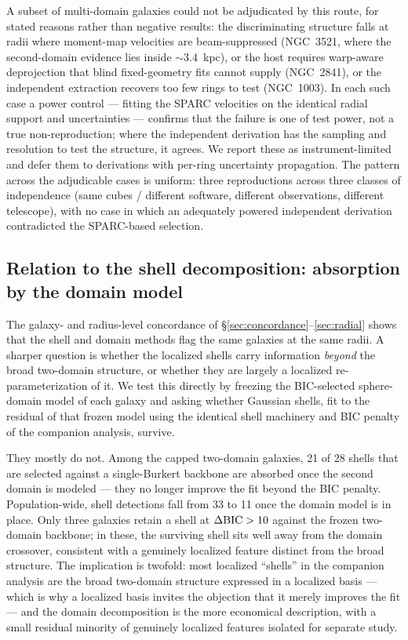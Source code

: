 \documentclass[twocolumn]{aastex631}
\newcommand{\dbic}{\Delta{\rm BIC}}
\begin{document}
A subset of multi-domain galaxies could not be adjudicated by this route, for
stated reasons rather than negative results: the discriminating structure falls
at radii where moment-map velocities are beam-suppressed (NGC~3521, where the
second-domain evidence lies inside $\sim 3.4$~kpc), or the host requires
warp-aware deprojection that blind fixed-geometry fits cannot supply (NGC~2841),
or the independent extraction recovers too few rings to test (NGC~1003). In each
such case a power control --- fitting the SPARC velocities on the identical
radial support and uncertainties --- confirms that the failure is one of test
power, not a true non-reproduction; where the independent derivation has the
sampling and resolution to test the structure, it agrees. We report these as
instrument-limited and defer them to derivations with per-ring uncertainty
propagation. The pattern across the adjudicable cases is uniform: three
reproductions across three classes of independence (same cubes / different
software, different observations, different telescope), with no case in which an
adequately powered independent derivation contradicted the SPARC-based selection.

\subsection{Relation to the shell decomposition: absorption by the domain model} \label{sec:absorption}

The galaxy- and radius-level concordance of \S\ref{sec:concordance}--\ref{sec:radial}
shows that the shell and domain methods flag the same galaxies at the same radii.
A sharper question is whether the localized shells carry information \emph{beyond}
the broad two-domain structure, or whether they are largely a localized
re-parameterization of it. We test this directly by freezing the BIC-selected
sphere-domain model of each galaxy and asking whether Gaussian shells, fit to the
residual of that frozen model using the identical shell machinery and BIC penalty
of the companion analysis, survive.

They mostly do not. Among the capped two-domain galaxies, 21 of 28 shells that
are selected against a single-Burkert backbone are absorbed once the second
domain is modeled --- they no longer improve the fit beyond the BIC penalty.
Population-wide, shell detections fall from 33 to 11 once the domain model is in
place. Only three galaxies retain a shell at $\dbic > 10$ against the frozen
two-domain backbone; in these, the surviving shell sits well away from the domain
crossover, consistent with a genuinely localized feature distinct from the broad
structure. The implication is twofold: most localized ``shells'' in the companion
analysis are the broad two-domain structure expressed in a localized basis ---
which is why a localized basis invites the objection that it merely improves the
fit --- and the domain decomposition is the more economical description, with a
small residual minority of genuinely localized features isolated for separate
study.
\end{document}
